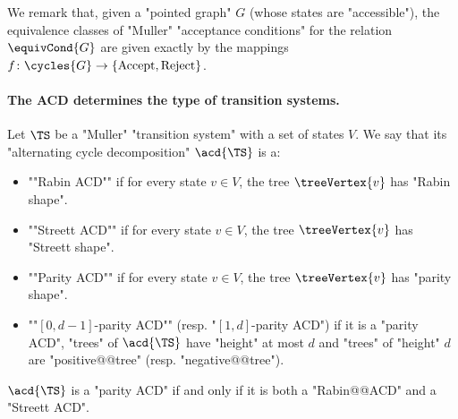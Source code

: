 \documentclass[10pt,a4paper]{amsart}
\begin{document}
We remark that, given a "pointed graph" $G$ (whose states are "accessible"), the equivalence classes of "Muller" "acceptance conditions" for the relation $\equivCond{G}$ are given exactly by the mappings $f\colon \cycles{G} \to \{\mathrm{Accept}, \mathrm{Reject} \}$.



\paragraph*{The ACD determines the type of transition systems.}
\begin{definition}\label{def-cor:ShapesOfACD}
	Let $\TS$ be a "Muller" "transition system" with a set of states $V$. We say that its "alternating cycle decomposition" $\acd{\TS}$ is a:
	\begin{itemize}
		\item  \AP""Rabin ACD"" if for every state $v\in V$, the tree $\treeVertex{v}$ has "Rabin shape".
		
		\item  \AP""Streett ACD"" if for every state $v\in V$, the tree $\treeVertex{v}$ has "Streett shape".
		
		\item  \AP""Parity ACD"" if for every state $v\in V$, the tree $\treeVertex{v}$ has "parity shape".
		\item \AP ""$[0,d-1]$-parity ACD"" (resp. "$[1,d]$-parity ACD") if it is a "parity ACD", "trees" of $\acd{\TS}$ have "height" at most $d$ and "trees" of "height" $d$ are "positive@@tree" (resp. "negative@@tree").
	\end{itemize}
\end{definition}

\begin{remark}\label{rmk-typ:shape-parity-Street-Rabin-ACD}
 $\acd{\TS}$ is a "parity ACD" if and only if it is both a "Rabin@@ACD" and a "Streett ACD". 
\end{remark}
\end{document}
